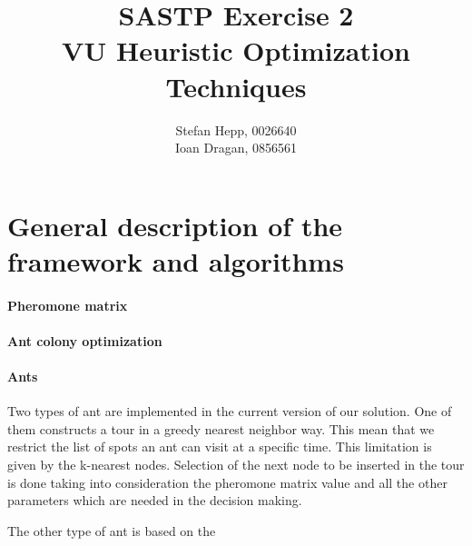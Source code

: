 \documentclass{article}
\title{SASTP Exercise 2\\
{VU Heuristic Optimization Techniques} }
\author{Stefan Hepp, 0026640 \\
Ioan Dragan, 0856561 }
\begin{document}
\maketitle
\section{General description of the framework and algorithms}

\paragraph{Pheromone matrix}

\paragraph{Ant colony optimization}

\paragraph{Ants}
Two types of ant are implemented in the current version of our solution. One of them constructs a tour in a greedy nearest neighbor way. This mean that we restrict the list of spots an ant can visit at a specific time. This limitation is given by the k-nearest nodes. Selection of the next node to be inserted in the tour is done taking into consideration the pheromone matrix value and all the other parameters which are needed in the decision making.

The other type of ant is based on the 

 






\end{document}

